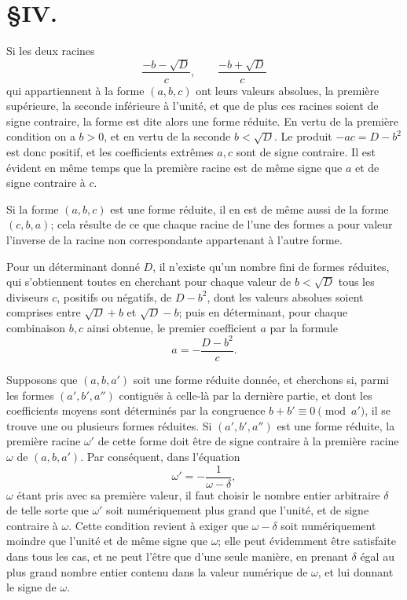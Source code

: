 \documentclass[11pt]{article}
\begin{document}
\section*{\S IV.}

Si les deux racines
\[
  \frac{-b-\sqrt D}{c},\qquad \frac{-b+\sqrt D}{c}
\]
qui appartiennent à la forme $(a,b,c)$ ont leurs valeurs absolues, la première supérieure, la seconde inférieure à l'unité, et que de plus ces racines soient de signe contraire, la forme est dite alors une forme réduite. En vertu de la première condition on a $b>0$, et en vertu de la seconde $b<\sqrt D$. Le produit $-ac=D-b^2$ est donc positif, et les coefficients extrêmes $a,c$ sont de signe contraire. Il est évident en même temps que la première racine est de même signe que $a$ et de signe contraire à $c$.

Si la forme $(a,b,c)$ est une forme réduite, il en est de même aussi de la forme $(c,b,a)$; cela résulte de ce que chaque racine de l'une des formes a pour valeur l'inverse de la racine non correspondante appartenant à l'autre forme.

Pour un déterminant donné $D$, il n'existe qu'un nombre fini de formes réduites, qui s'obtiennent toutes en cherchant pour chaque valeur de $b<\sqrt D$ tous les diviseurs $c$, positifs ou négatifs, de $D-b^2$, dont les valeurs absolues soient comprises entre $\sqrt D+b$ et $\sqrt D-b$; puis en déterminant, pour chaque combinaison $b,c$ ainsi obtenue, le premier coefficient $a$ par la formule
\[
  a=-\frac{D-b^2}{c}.
\]

Supposons que $(a,b,a')$ soit une forme réduite donnée, et cherchons si, parmi les formes $(a',b',a'')$ contiguës à celle-là par la dernière partie, et dont les coefficients moyens sont déterminés par la congruence $b+b'\equiv0\pmod {a'}$, il se trouve une ou plusieurs formes réduites. Si $(a',b',a'')$ est une forme réduite, la première racine $\omega'$ de cette forme doit être de signe contraire à la première racine $\omega$ de $(a,b,a')$. Par conséquent, dans l'équation
\[
  \omega'=-\frac1{\omega-\delta},
\]
$\omega$ étant pris avec sa première valeur, il faut choisir le nombre entier arbitraire $\delta$ de telle sorte que $\omega'$ soit numériquement plus grand que l'unité, et de signe contraire à $\omega$. Cette condition revient à exiger que $\omega-\delta$ soit numériquement moindre que l'unité et de même signe que $\omega$; elle peut évidemment être satisfaite dans tous les cas, et ne peut l'être que d'une seule manière, en prenant $\delta$ égal au plus grand nombre entier contenu dans la valeur numérique de $\omega$, et lui donnant le signe de $\omega$.
\end{document}
